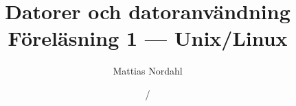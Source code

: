 \documentclass[trans]{beamer}
\author[]{Mattias Nordahl}
\institute{\url{mattias.nordahl@cs.lth.se}}
\date{}
\begin{document}
\title{Datorer och datoranvändning\\Föreläsning 1 --- Unix/Linux}

\frame[plain]{
	\maketitle
	\vspace{-2\baselineskip}
}

\date{\the\year/\the\numexpr{}}


\end{document}
